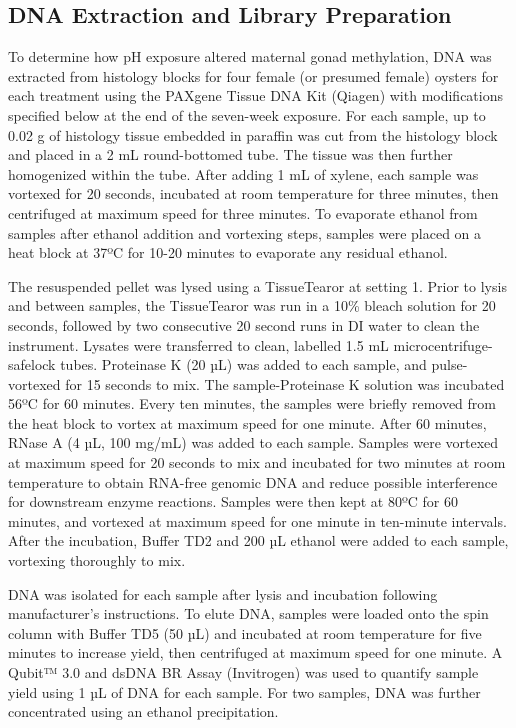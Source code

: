 \documentclass [11pt, proquest] {uwthesis}[2015/03/03]
\begin{document}
\hypertarget{dna-extraction-and-library-preparation}{%
\subsection{DNA Extraction and Library Preparation}\label{dna-extraction-and-library-preparation}}

To determine how pH exposure altered maternal gonad methylation, DNA was extracted from histology blocks for four female (or presumed female) oysters for each treatment using the PAXgene Tissue DNA Kit (Qiagen) with modifications specified below at the end of the seven-week exposure. For each sample, up to 0.02 g of histology tissue embedded in paraffin was cut from the histology block and placed in a 2 mL round-bottomed tube. The tissue was then further homogenized within the tube. After adding 1 mL of xylene, each sample was vortexed for 20 seconds, incubated at room temperature for three minutes, then centrifuged at maximum speed for three minutes. To evaporate ethanol from samples after ethanol addition and vortexing steps, samples were placed on a heat block at 37ºC for 10-20 minutes to evaporate any residual ethanol.

The resuspended pellet was lysed using a TissueTearor at setting 1. Prior to lysis and between samples, the TissueTearor was run in a 10\% bleach solution for 20 seconds, followed by two consecutive 20 second runs in DI water to clean the instrument. Lysates were transferred to clean, labelled 1.5 mL microcentrifuge-safelock tubes. Proteinase K (20 µL) was added to each sample, and pulse-vortexed for 15 seconds to mix. The sample-Proteinase K solution was incubated 56ºC for 60 minutes. Every ten minutes, the samples were briefly removed from the heat block to vortex at maximum speed for one minute. After 60 minutes, RNase A (4 µL, 100 mg/mL) was added to each sample. Samples were vortexed at maximum speed for 20 seconds to mix and incubated for two minutes at room temperature to obtain RNA-free genomic DNA and reduce possible interference for downstream enzyme reactions. Samples were then kept at 80ºC for 60 minutes, and vortexed at maximum speed for one minute in ten-minute intervals. After the incubation, Buffer TD2 and 200 µL ethanol were added to each sample, vortexing thoroughly to mix.

DNA was isolated for each sample after lysis and incubation following manufacturer's instructions. To elute DNA, samples were loaded onto the spin column with Buffer TD5 (50 µL) and incubated at room temperature for five minutes to increase yield, then centrifuged at maximum speed for one minute. A Qubit™ 3.0 and dsDNA BR Assay (Invitrogen) was used to quantify sample yield using 1 µL of DNA for each sample. For two samples, DNA was further concentrated using an ethanol precipitation.
\end{document}
